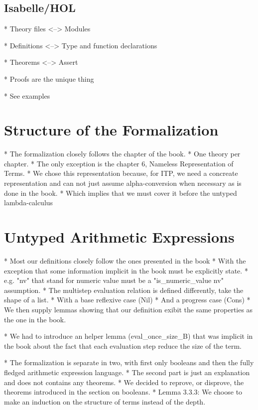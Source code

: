 \documentclass[a4paper, oneside, 12pt, titlepage]{article}
\begin{document}
\subsection{Isabelle/HOL}

  * Theory files <--> Modules

  * Definitions <--> Type and function declarations

  * Theorems <--> Assert

  * Proofs are the unique thing

  * See examples

\section{Structure of the Formalization}
\label{sec:structure-of-formalization}

  * The formalization closely follows the chapter of the book.
    * One theory per chapter.
    * The only exception is the chapter 6, Nameless Representation of Terms.
      * We chose this representation because, for ITP, we need a concreate representation and can
        not just assume alpha-conversion when necessary as is done in the book.
      * Which implies that we must cover it before the untyped lambda-calculus

\section{Untyped Arithmetic Expressions}
\label{sec:untyped-arith-expr}

  * Most our definitions closely follow the ones presented in the book
    * With the exception that some information implicit in the book must be explicitly state.
      * e.g. "nv" that stand for numeric value must be a "is\_numeric\_value nv" assumption.
    * The multistep evaluation relation is defined differently, take the shape of a list.
      * With a base reflexive case (Nil)
      * And a progress case (Cons)
      * We then supply lemmas showing that our definition exibit the same properties as the one in
        the book.

  * We had to introduce an helper lemma (eval\_once\_size\_B) that was implicit in the book about the
    fact that each evaluation step reduce the size of the term.

  * The formalization is separate in two, with first only booleans and then the fully fledged
    arithmetic expression language.
    * The second part is just an explanation and does not contains any theorems.
      * We decided to reprove, or disprove, the theorems introduced in the section on booleans.
  * Lemma 3.3.3: We choose to make an induction on the structure of terms instead of the depth.
\end{document}
